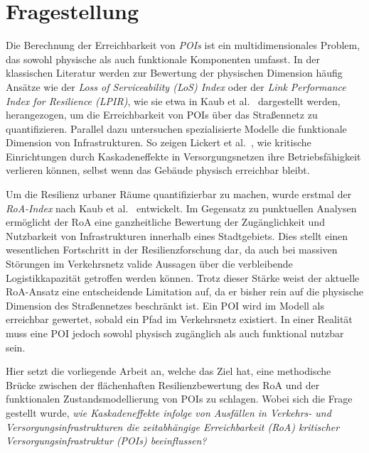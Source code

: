 


\section{Fragestellung}
\label{sec:fragestellung}


Die Berechnung der Erreichbarkeit von \textit{POIs} ist ein multidimensionales Problem, das sowohl physische als auch funktionale Komponenten umfasst.
In der klassischen Literatur werden zur Bewertung der physischen Dimension häufig Ansätze wie der \textit{Loss of Serviceability (LoS) Index} oder der \textit{Link Performance Index for Resilience (LPIR)}, wie sie etwa in Kaub et al.\ \cite{kaub2024} dargestellt werden, herangezogen, um die Erreichbarkeit von POIs über das Straßennetz zu quantifizieren.
Parallel dazu untersuchen spezialisierte Modelle die funktionale Dimension von Infrastrukturen.
So zeigen Lickert et al.\ \cite{lickert2024}, wie kritische Einrichtungen durch Kaskadeneffekte in Versorgungsnetzen ihre Betriebsfähigkeit verlieren können, selbst wenn das Gebäude physisch erreichbar bleibt.

Um die Resilienz urbaner Räume quantifizierbar zu machen, wurde erstmal der \textit{RoA-Index} nach Kaub et al.\ \cite{kaub2024} entwickelt.
Im Gegensatz zu punktuellen Analysen ermöglicht der RoA eine ganzheitliche Bewertung der Zugänglichkeit und Nutzbarkeit von Infrastrukturen innerhalb eines Stadtgebiets.
Dies stellt einen wesentlichen Fortschritt in der Resilienzforschung dar, da auch bei massiven Störungen im Verkehrsnetz valide Aussagen über die verbleibende Logistikkapazität getroffen werden können.
Trotz dieser Stärke weist der aktuelle RoA-Ansatz eine entscheidende Limitation auf, da er bisher rein auf die physische Dimension des Straßennetzes beschränkt ist.
Ein POI wird im Modell als erreichbar gewertet, sobald ein Pfad im Verkehrsnetz existiert.
In einer Realität muss eine POI jedoch sowohl physisch zugänglich als auch funktional nutzbar sein.

Hier setzt die vorliegende Arbeit an, welche das Ziel hat, eine methodische Brücke zwischen der flächenhaften Resilienzbewertung des RoA und der funktionalen Zustandsmodellierung von POIs zu schlagen.
Wobei sich die Frage gestellt wurde, \textit{wie Kaskadeneffekte infolge von Ausfällen in Verkehrs- und Versorgungsinfrastrukturen die zeitabhängige Erreichbarkeit (RoA) kritischer Versorgungsinfrastruktur (POIs) beeinflussen?}

